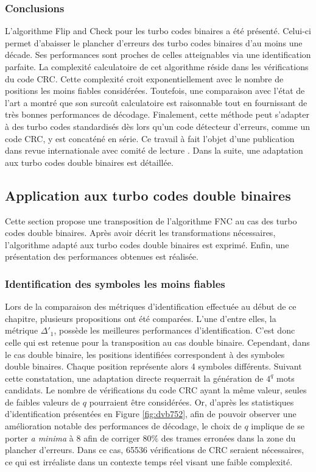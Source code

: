 \subsubsection{Conclusions}
L'algorithme Flip and Check pour les turbo codes binaires a été présenté. Celui-ci permet d'abaisser le plancher d'erreurs 
des turbo codes binaires d'au moins une décade. Ses performances sont proches de celles atteignables via une 
identification parfaite. La complexité calculatoire de cet algorithme réside dans les vérifications du code CRC. Cette 
complexité croit exponentiellement avec le nombre de positions les moins fiables considérées. Toutefois, une 
comparaison avec l'état de l'art a montré que son surcoût calculatoire est raisonnable tout en fournissant de très bonnes 
performances de décodage. Finalement, cette méthode peut s'adapter à des turbo codes standardisés dès lors qu'un code 
détecteur d'erreurs, comme un code CRC, y est concaténé en série. Ce travail à fait l'objet d'une publication dans revue
internationale avec comité de lecture . Dans la suite, une adaptation aux turbo codes double binaires est détaillée.


\subsection{Application aux turbo codes double binaires}
Cette section propose une transposition de l'algorithme FNC au cas des turbo codes double binaires. Après avoir décrit 
les transformations nécessaires, l'algorithme adapté aux turbo codes double binaires est exprimé. Enfin, une présentation 
des performances obtenues est réalisée.
\subsubsection{Identification des symboles les moins fiables}
Lors de la comparaison des métriques d'identification effectuée au début de ce chapitre, plusieurs propositions ont été 
comparées. L'une d'entre elles, la métrique $\Delta'_1$, possède les meilleures performances d'identification. C'est donc
celle qui est retenue pour la transposition au cas double binaire. Cependant, dans le cas double binaire, les positions identifiées correspondent 
à des symboles double binaires. Chaque position représente alors 4 symboles différents. Suivant cette constatation, une adaptation directe 
requerrait la génération de $4^q$ mots candidats. Le nombre de vérifications du code CRC ayant la même valeur, 
seules de faibles valeurs de $q$ pourraient être considérées. Or, d'après les statistiques d'identification présentées en Figure 
\ref{fig:dvb752}, afin de pouvoir observer une amélioration notable des performances de décodage, le choix de $q$ implique 
de se porter \textit{a minima} à 8 afin de corriger $80\%$ des trames erronées dans la zone du plancher d'erreurs. Dans 
ce cas, 65536 vérifications de CRC seraient nécessaires, ce qui est 
irréaliste dans un contexte temps réel visant une faible complexité.

